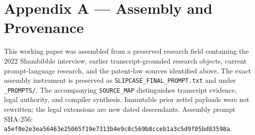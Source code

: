 \documentclass[11pt]{article}
\begin{document}
\section*{Appendix A — Assembly and Provenance}
This working paper was assembled from a preserved research field containing the 2022 Shambibble interview, earlier transcript-grounded research objects, current prompt-language research, and the patent-law sources identified above. The exact assembly instrument is preserved as \texttt{SLIPCASE\_FINAL\_PROMPT.txt} and under \texttt{\_PROMPTS/}. The accompanying \texttt{SOURCE\_MAP} distinguishes transcript evidence, legal authority, and compiler synthesis. Immutable prior zettel payloads were not rewritten; the legal extensions are new dated descendants. Assembly prompt SHA-256: \texttt{a5ef0e2e3ea56463e25065f19e7313b4e9c8c569b8cceb1a3c5d9f05bd83598a}.
\end{document}
